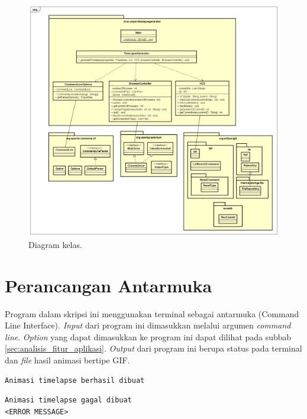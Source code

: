 \begin{figure}[H]
	\centering
		\includegraphics[scale=0.42]{Gambar/ClassDiagram.png}
	\caption{Diagram kelas.}
	\label{fig:class_diagram}
\end{figure}


\section{Perancangan Antarmuka}
\label{sec:perancangan_antarmuka}
Program dalam skripsi ini menggunakan terminal sebagai antarmuka (Command Line Interface). \textit{Input} dari program ini dimasukkan melalui argumen \textit{command line}. \textit{Option} yang dapat dimasukkan ke program ini dapat dilihat pada subbab \ref{sec:analisis_fitur_aplikasi}. \textit{Output} dari program ini berupa status pada terminal dan \textit{file} hasil animasi bertipe GIF.  

\begin{lstlisting}[caption={Status pesan yang muncul pada terminal saat program berhasil membangkitkan animasi \textit{timelapse}.},label={lst:status_pesan_berhasil},language=plaintext]
Animasi timelapse berhasil dibuat
\end{lstlisting}

\begin{lstlisting}[caption={Status pesan yang muncul pada terminal saat program gagal membangkitkan animasi \textit{timelapse}.},label={lst:status_pesan_gagal},language=plaintext]
Animasi timelapse gagal dibuat
<ERROR MESSAGE>
\end{lstlisting}

